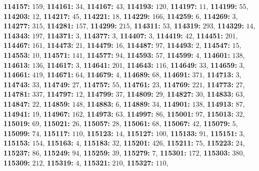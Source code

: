 \textsf{\bfseries 114157:} $159$, \textsf{\bfseries 114161:} $34$, \textsf{\bfseries 114167:} $43$, \textsf{\bfseries 114193:} $120$, \textsf{\bfseries 114197:} $11$, \textsf{\bfseries 114199:} $55$, \textsf{\bfseries 114203:} $12$, \textsf{\bfseries 114217:} $45$, \textsf{\bfseries 114221:} $18$, \textsf{\bfseries 114229:} $166$, \textsf{\bfseries 114259:} $6$, \textsf{\bfseries 114269:} $3$, \textsf{\bfseries 114277:} $315$, \textsf{\bfseries 114281:} $157$, \textsf{\bfseries 114299:} $215$, \textsf{\bfseries 114311:} $53$, \textsf{\bfseries 114319:} $293$, \textsf{\bfseries 114329:} $14$, \textsf{\bfseries 114343:} $197$, \textsf{\bfseries 114371:} $3$, \textsf{\bfseries 114377:} $3$, \textsf{\bfseries 114407:} $3$, \textsf{\bfseries 114419:} $42$, \textsf{\bfseries 114451:} $201$, \textsf{\bfseries 114467:} $161$, \textsf{\bfseries 114473:} $21$, \textsf{\bfseries 114479:} $16$, \textsf{\bfseries 114487:} $97$, \textsf{\bfseries 114493:} $2$, \textsf{\bfseries 114547:} $15$, \textsf{\bfseries 114553:} $10$, \textsf{\bfseries 114571:} $141$, \textsf{\bfseries 114577:} $94$, \textsf{\bfseries 114593:} $57$, \textsf{\bfseries 114599:} $4$, \textsf{\bfseries 114601:} $138$, \textsf{\bfseries 114613:} $136$, \textsf{\bfseries 114617:} $3$, \textsf{\bfseries 114641:} $201$, \textsf{\bfseries 114643:} $116$, \textsf{\bfseries 114649:} $33$, \textsf{\bfseries 114659:} $3$, \textsf{\bfseries 114661:} $419$, \textsf{\bfseries 114671:} $64$, \textsf{\bfseries 114679:} $4$, \textsf{\bfseries 114689:} $68$, \textsf{\bfseries 114691:} $371$, \textsf{\bfseries 114713:} $3$, \textsf{\bfseries 114743:} $33$, \textsf{\bfseries 114749:} $27$, \textsf{\bfseries 114757:} $55$, \textsf{\bfseries 114761:} $23$, \textsf{\bfseries 114769:} $221$, \textsf{\bfseries 114773:} $27$, \textsf{\bfseries 114781:} $337$, \textsf{\bfseries 114797:} $12$, \textsf{\bfseries 114799:} $37$, \textsf{\bfseries 114809:} $29$, \textsf{\bfseries 114827:} $30$, \textsf{\bfseries 114833:} $63$, \textsf{\bfseries 114847:} $22$, \textsf{\bfseries 114859:} $148$, \textsf{\bfseries 114883:} $6$, \textsf{\bfseries 114889:} $34$, \textsf{\bfseries 114901:} $138$, \textsf{\bfseries 114913:} $87$, \textsf{\bfseries 114941:} $19$, \textsf{\bfseries 114967:} $162$, \textsf{\bfseries 114973:} $63$, \textsf{\bfseries 114997:} $86$, \textsf{\bfseries 115001:} $97$, \textsf{\bfseries 115013:} $32$, \textsf{\bfseries 115019:} $69$, \textsf{\bfseries 115021:} $26$, \textsf{\bfseries 115057:} $28$, \textsf{\bfseries 115061:} $68$, \textsf{\bfseries 115067:} $42$, \textsf{\bfseries 115079:} $5$, \textsf{\bfseries 115099:} $74$, \textsf{\bfseries 115117:} $110$, \textsf{\bfseries 115123:} $14$, \textsf{\bfseries 115127:} $100$, \textsf{\bfseries 115133:} $91$, \textsf{\bfseries 115151:} $3$, \textsf{\bfseries 115153:} $154$, \textsf{\bfseries 115163:} $4$, \textsf{\bfseries 115183:} $32$, \textsf{\bfseries 115201:} $426$, \textsf{\bfseries 115211:} $75$, \textsf{\bfseries 115223:} $24$, \textsf{\bfseries 115237:} $86$, \textsf{\bfseries 115249:} $94$, \textsf{\bfseries 115259:} $39$, \textsf{\bfseries 115279:} $7$, \textsf{\bfseries 115301:} $172$, \textsf{\bfseries 115303:} $380$, \textsf{\bfseries 115309:} $212$, \textsf{\bfseries 115319:} $4$, \textsf{\bfseries 115321:} $210$, \textsf{\bfseries 115327:} $110$, 
